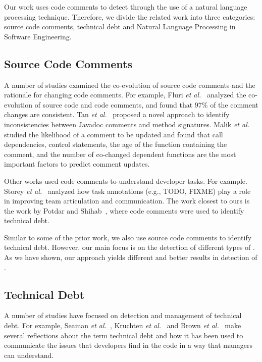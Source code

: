 Our work uses code comments to detect \SATD through the use of a natural language processing technique. Therefore, we divide the related work into three categories: source code comments, technical debt and Natural Language Processing in Software Engineering.

\subsection{Source Code Comments}

A number of studies examined the co-evolution of source code comments and the rationale for changing code comments. For example, Fluri \textit{et al.}~\cite{Fluri2007WCRE} analyzed the co-evolution of source code and code comments, and found that 97\% of the comment changes are consistent. Tan \textit{et al.}~\cite{Tan2012ICST} proposed a novel approach to identify inconsistencies between Javadoc comments and method signatures. Malik \textit{et al.} \cite{Malik2008ICSM} studied the likelihood of a comment to be updated and found that call dependencies, control statements, the age of the function containing the comment, and the number of co-changed dependent functions are the most important factors to predict comment updates.

Other works used code comments to understand developer tasks. For example. Storey \textit{et al.}~\cite{Storey2008ICSE} analyzed how task annotations (e.g., TODO, FIXME) play a role in improving team articulation and communication. The work closest to ours is the work by Potdar and Shihab~\cite{Potdar2014ICSME}, where code comments were used to identify technical debt. 

Similar to some of the prior work, we also use source code comments to identify technical debt. However, our main focus is on the detection of different types of \SATD. As we have shown, our approach yields different and better results in detection of \SATD.

\subsection{Technical Debt}

A number of studies have focused on detection and management of technical debt. For example, Seaman \textit{et al.}~\cite{Seaman2011}, Kruchten \textit{et al.}~\cite{Kruchten2013IWMTD} and Brown \textit{et al.}~\cite{Brown2010MTD} make several reflections about the term technical debt and how it has been used to communicate the issues that developers find in the code in a way that managers can understand. 


